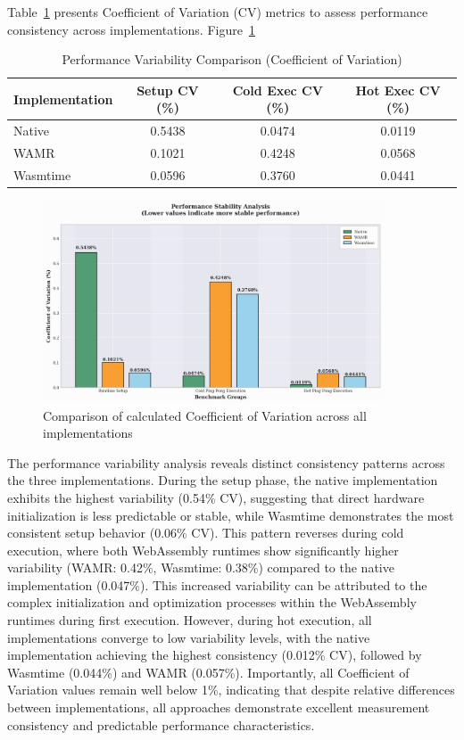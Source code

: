 Table~\ref{tab:variability} presents Coefficient of Variation (CV) metrics to assess performance consistency across implementations. Figure~\ref{fig:variability-comparison}

\begin{table}[h]
    \centering
    \caption{Performance Variability Comparison (Coefficient of Variation)}
    \label{tab:variability}
    \begin{tabular}{lccc}
    \toprule
    \textbf{Implementation} & \textbf{Setup CV (\%)} & \textbf{Cold Exec CV (\%)} & \textbf{Hot Exec CV (\%)} \\
    \midrule
    Native       & 0.5438 & 0.0474 & 0.0119 \\
    WAMR         & 0.1021 & 0.4248 & 0.0568 \\
    Wasmtime     & 0.0596 & 0.3760 & 0.0441 \\
    \bottomrule
    \end{tabular}
\end{table}

\begin{figure}[h]
    \centering
    \includegraphics[width=0.9\textwidth]{images/variability-comparison}
    \caption{Comparison of calculated Coefficient of Variation across all implementations}
    \label{fig:variability-comparison}
\end{figure}

The performance variability analysis reveals distinct consistency patterns across the three implementations. During the setup phase, the native implementation exhibits the highest variability (0.54\% CV), suggesting that direct hardware initialization is less predictable or stable, while Wasmtime demonstrates the most consistent setup behavior (0.06\% CV). This pattern reverses during cold execution, where both WebAssembly runtimes show significantly higher variability (WAMR: 0.42\%, Wasmtime: 0.38\%) compared to the native implementation (0.047\%). This increased variability can be attributed to the complex initialization and optimization processes within the WebAssembly runtimes during first execution. However, during hot execution, all implementations converge to low variability levels, with the native implementation achieving the highest consistency (0.012\% CV), followed by Wasmtime (0.044\%) and WAMR (0.057\%). Importantly, all Coefficient of Variation values remain well below 1\%, indicating that despite relative differences between implementations, all approaches demonstrate excellent measurement consistency and predictable performance characteristics.

